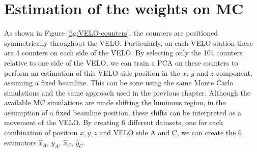 \section{Estimation of the weights on MC}
As shown in Figure \ref{fig:VELO-counters}, the counters are positioned symmetrically throughout the VELO. Particularly, on each VELO station there are 4 counters on each side of the VELO. By selecting only the 104 counters relative to one side of the VELO, we can train a PCA on these counters to perform an estimation of this VELO side position in the $x$, $y$ and $z$ component, assuming a fixed beamline. This can be sone using the same Monte Carlo simulations and the same approach used in the previous chapter. Although the available MC simulations are made shifting the luminous region, in the assumption of a fixed beamline position, these shifts can be interpreted as a movement of the VELO. By creating 6 different datasets, one for each combination of position $x,y,z$ and VELO side A and C, we can create the 6 estimators $\hat{x}_A$, $\hat{y}_A$, $\hat{x}_C$, $\hat{y}_C$. 

